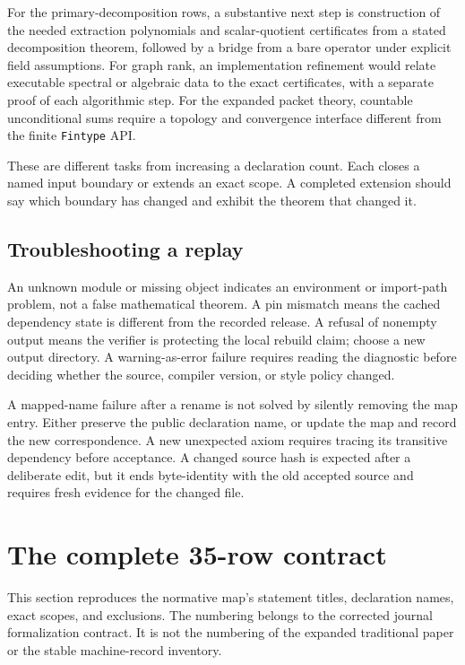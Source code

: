 \documentclass[11pt,a4paper]{article}
\newcommand{\code}[1]{\nolinkurl{#1}}
\begin{document}
For the primary-decomposition rows, a substantive next step is construction of the needed extraction polynomials and scalar-quotient certificates from a stated decomposition theorem, followed by a bridge from a bare operator under explicit field assumptions. For graph rank, an implementation refinement would relate executable spectral or algebraic data to the exact certificates, with a separate proof of each algorithmic step. For the expanded packet theory, countable unconditional sums require a topology and convergence interface different from the finite \code{Fintype} API.

These are different tasks from increasing a declaration count. Each closes a named input boundary or extends an exact scope. A completed extension should say which boundary has changed and exhibit the theorem that changed it.

\subsection{Troubleshooting a replay}

An unknown module or missing object indicates an environment or import-path problem, not a false mathematical theorem. A pin mismatch means the cached dependency state is different from the recorded release. A refusal of nonempty output means the verifier is protecting the local rebuild claim; choose a new output directory. A warning-as-error failure requires reading the diagnostic before deciding whether the source, compiler version, or style policy changed.

A mapped-name failure after a rename is not solved by silently removing the map entry. Either preserve the public declaration name, or update the map and record the new correspondence. A new unexpected axiom requires tracing its transitive dependency before acceptance. A changed source hash is expected after a deliberate edit, but it ends byte-identity with the old accepted source and requires fresh evidence for the changed file.

\clearpage
\section{The complete 35-row contract}\label{sec:map}

This section reproduces the normative map's statement titles, declaration names, exact scopes, and exclusions. The numbering belongs to the corrected journal formalization contract. It is not the numbering of the expanded traditional paper or the stable machine-record inventory.
\end{document}
